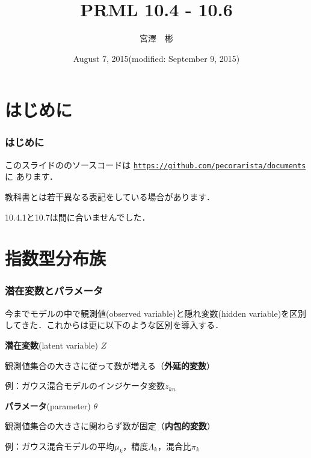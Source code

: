 \documentclass[10pt,usepdftitle=false,hyperref={unicode}]{beamer}
\title{PRML 10.4 - 10.6}
\date{August 7, 2015\newline(modified: September 9, 2015)}
\institute{総合研究大学院大学 博士前期\newline\newline\texttt{miyazawa-a@nii.ac.jp}}
\author{宮澤　彬}
\newenvironment{wideitemize}{\itemize\addtolength{\itemsep}{1em}}{\enditemize}
\begin{document}
\setlength{\jot}{1.5\jot}
\nocite{bishop2008}
\begin{frame}
\maketitle
\end{frame}


\section{はじめに}

\begin{frame}
    \frametitle{はじめに}
    \begin{wideitemize}
        \item このスライドの{\LuaLaTeX}のソースコードは
            \href{https://github.com/pecorarista/documents}{\texttt{https://github.com/pecorarista/documents}}に
            あります．
        \item 教科書とは若干異なる表記をしている場合があります．
        \item 10.4.1と10.7は間に合いませんでした．
    \end{wideitemize}
\end{frame}

\section{指数型分布族}

\begin{frame}
\frametitle{潜在変数とパラメータ}
今までモデルの中で観測値(observed variable)と隠れ変数(hidden variable)を区別してきた．これからは更に以下のような区別を導入する．

\bigskip

\begin{wideitemize}
    \item \textbf{潜在変数}(latent variable) $Z$

        観測値集合の大きさに従って数が増える（\textbf{外延的変数}）

        例：ガウス混合モデルのインジケータ変数$z_{kn}$

    \item \textbf{パラメータ}(parameter) $\theta$

        観測値集合の大きさに関わらず数が固定（\textbf{内包的変数}）

        例：ガウス混合モデルの平均$\mu_k$，精度$\varLambda_k$，混合比$\pi_k$
\end{wideitemize}
\end{frame}
\end{document}
